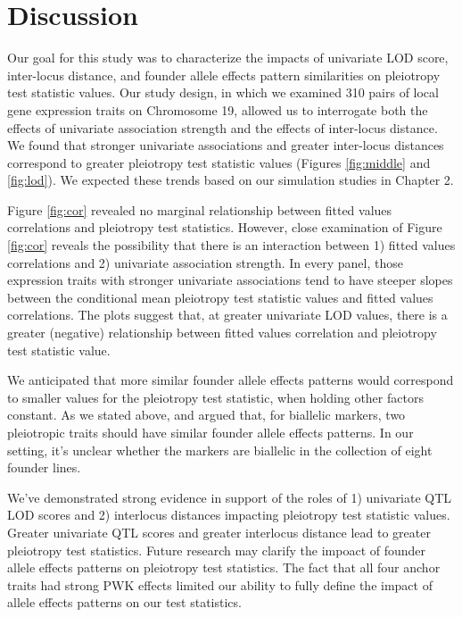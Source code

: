 \documentclass{article}
\begin{document}
\section{Discussion}

Our goal for this study was to characterize the impacts of univariate LOD score, inter-locus distance, and founder allele effects pattern similarities on pleiotropy test statistic values. Our study design, in which we examined 310 pairs of local gene expression traits on Chromosome 19, allowed us to interrogate both the effects of univariate association strength and the effects of inter-locus distance. We found that stronger univariate associations and greater inter-locus distances correspond to greater pleiotropy test statistic values (Figures \ref{fig:middle} and \ref{fig:lod}). We expected these trends based on our simulation studies in Chapter 2.

Figure \ref{fig:cor} revealed no marginal relationship between fitted values correlations and pleiotropy test statistics. However, close examination of Figure \ref{fig:cor} reveals the possibility that there is an interaction between 1) fitted values correlations and 2) univariate association strength. In every panel, those expression traits with stronger univariate associations tend to have steeper slopes between the conditional mean pleiotropy test statistic values and fitted values correlations. The plots suggest that, at greater univariate LOD values, there is a greater (negative) relationship between fitted values correlation and pleiotropy test statistic value. 

We anticipated that more similar founder allele effects patterns would correspond to smaller values for the pleiotropy test statistic, when holding other factors constant. As we stated above, \citet{macdonald2007joint} and \citet{king2012genetic} argued that, for biallelic markers, two pleiotropic traits should have similar founder allele effects patterns. In our setting, it's unclear whether the markers are biallelic in the collection of eight founder lines. 

We've demonstrated strong evidence in support of the roles of 1) univariate QTL LOD scores and 2) interlocus distances impacting pleiotropy test statistic values. Greater univariate QTL scores and greater interlocus distance lead to greater pleiotropy test statistics. Future research may clarify the impoact of founder allele effects patterns on pleiotropy test statistics. The fact that all four anchor traits had strong PWK effects limited our ability to fully define the impact of allele effects patterns on our test statistics.
\end{document}
